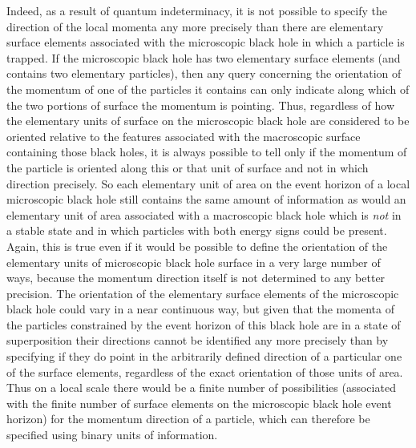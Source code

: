 \documentclass[notitlepage,12pt]{report}
\begin{document}
Indeed, as a result of quantum indeterminacy, it is not possible to specify the direction of the local momenta any more precisely than there are elementary surface elements associated with the microscopic black hole in which a particle is trapped. If the microscopic black hole has two elementary surface elements (and contains two elementary particles), then any query concerning the orientation of the momentum of one of the particles it contains can only indicate along which of the two portions of surface the momentum is pointing. Thus, regardless of how the elementary units of surface on the microscopic black hole are considered to be oriented relative to the features associated with the macroscopic surface containing those black holes, it is always possible to tell only if the momentum of the particle is oriented along this or that unit of surface and not in which direction precisely. So each elementary unit of area on the event horizon of a local microscopic black hole still contains the same amount of information as would an elementary unit of area associated with a macroscopic black hole which is \textit{not} in a stable state and in which particles with both energy signs could be present. Again, this is true even if it would be possible to define the orientation of the elementary units of microscopic black hole surface in a very large number of ways, because the momentum direction itself is not determined to any better precision. The orientation of the elementary surface elements of the microscopic black hole could vary in a near continuous way, but given that the momenta of the particles constrained by the event horizon of this black hole are in a state of superposition their directions cannot be identified any more precisely than by specifying if they do point in the arbitrarily defined direction of a particular one of the surface elements, regardless of the exact orientation of those units of area. Thus on a local scale there would be a finite number of possibilities (associated with the finite number of surface elements on the microscopic black hole event horizon) for the momentum direction of a particle, which can therefore be specified using binary units of information.
\end{document}

